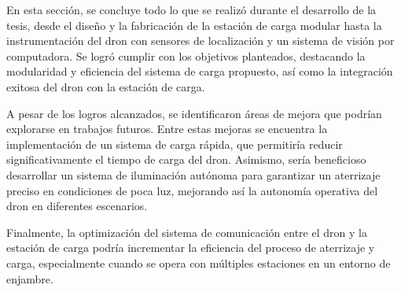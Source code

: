 
En esta sección, se concluye todo lo que se realizó durante el desarrollo de la tesis, desde el diseño y la fabricación de la estación de carga modular hasta la instrumentación del dron con sensores de localización y un sistema de visión por computadora. Se logró cumplir con los objetivos planteados, destacando la modularidad y eficiencia del sistema de carga propuesto, así como la integración exitosa del dron con la estación de carga.

A pesar de los logros alcanzados, se identificaron áreas de mejora que podrían explorarse en trabajos futuros. Entre estas mejoras se encuentra la implementación de un sistema de carga rápida, que permitiría reducir significativamente el tiempo de carga del dron. Asimismo, sería beneficioso desarrollar un sistema de iluminación autónoma para garantizar un aterrizaje preciso en condiciones de poca luz, mejorando así la autonomía operativa del dron en diferentes escenarios.

Finalmente, la optimización del sistema de comunicación entre el dron y la estación de carga podría incrementar la eficiencia del proceso de aterrizaje y carga, especialmente cuando se opera con múltiples estaciones en un entorno de enjambre.